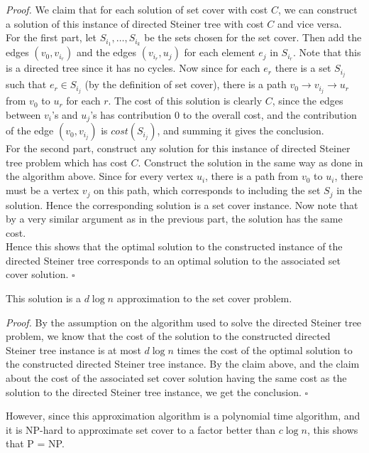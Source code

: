 \documentclass[a4paper]{article}
\newenvironment{proof}{\begin{breakbox}\textit{Proof.}}{\hfill$\square$\end{breakbox}}
\newcommand{\nl}{\vspace{0.2cm}\\}
\begin{document}
\begin{proof}
    We claim that for each solution of set cover with cost $C$, we can construct a solution of this instance of directed Steiner tree with cost $C$ and vice versa.\nl
    For the first part, let $S_{i_1}, \ldots, S_{i_k}$ be the sets chosen for the set cover. Then add the edges $(v_0, v_{i_r})$ and the edges $(v_{i_r}, u_j)$ for each element $e_j$ in $S_{i_r}$.
    Note that this is a directed tree since it has no cycles. Now since for each $e_r$ there is a set $S_{i_j}$ such that $e_r \in S_{i_j}$ (by the definition of set cover), there is a path $v_0
    \to v_{i_j} \to u_r$ from $v_0$ to $u_r$ for each $r$. The cost of this solution is clearly $C$, since the edges between $v_i$'s and $u_j$'s has contribution $0$ to the overall cost, and the
    contribution of the edge $(v_0, v_{i_j})$ is $cost(S_{i_j})$, and summing it gives the conclusion.\nl
    For the second part, construct any solution for this instance of directed Steiner tree problem which has cost $C$. Construct the solution in the same way as done in the algorithm above. Since for
    every vertex $u_i$, there is a path from $v_0$ to $u_i$, there must be a vertex $v_j$ on this path, which corresponds to including the set $S_j$ in the solution. Hence the corresponding
    solution is a set cover instance. Now note that by a very similar argument as in the previous part, the solution has the same cost.\nl
    Hence this shows that the optimal solution to the constructed instance of the directed Steiner tree corresponds to an optimal solution to the associated set cover solution.
\end{proof}

\begin{claim}
    This solution is a $d \log n$ approximation to the set cover problem.
\end{claim}

\begin{proof}
    By the assumption on the algorithm used to solve the directed Steiner tree problem, we know that the cost of the solution to the constructed directed Steiner tree instance is at most $d \log n$ times the cost of
    the optimal solution to the constructed directed Steiner tree instance. By the claim above, and the claim about the cost of the associated set cover solution having the same cost as the
    solution to the directed Steiner tree instance, we get the conclusion.
\end{proof}

However, since this approximation algorithm is a polynomial time algorithm, and it is NP-hard to approximate set cover to a factor better than $c \log n$, this shows that P = NP.
\newpage
\end{document}
